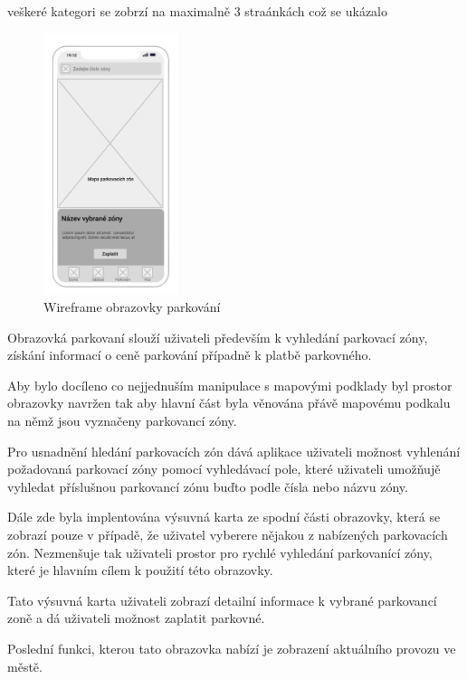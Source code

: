 veškeré kategori se zobrzí na maximalně 3 straánkách což se ukázalo


\begin{figure}
  \centering
  \includegraphics[width=0.35\textwidth]{parking_wireframe.png} 
  \caption{Wireframe obrazovky parkování}
\end{figure}

Obrazovká parkovaní slouží uživateli především k vyhledání parkovací zóny, získání informací o ceně parkování případně k platbě parkovného.

Aby bylo docíleno co nejjednuším manipulace s mapovými podklady byl prostor obrazovky navržen tak aby hlavní část byla věnována přávě mapovému
podkalu na němž jsou vyznačeny parkovancí zóny. 

Pro usnadnění hledání parkovacích zón dává aplikace uživateli možnost vyhlenání požadovaná parkovací zóny pomocí vyhledávací pole, které 
uživateli umožňujě vyhledat příslušnou parkovancí zónu buďto podle čísla nebo názvu zóny. 

Dále zde byla implentována výsuvná karta ze spodní části obrazovky, která se zobrazí pouze v případě, že uživatel vyberere nějakou
z nabízených parkovacích zón. Nezmenšuje tak uživateli prostor pro rychlé vyhledání parkovanící zóny, které je hlavním cílem k použití této obrazovky. 

Tato výsuvná karta uživateli zobrazí detailní informace k vybrané parkovancí zoně a dá uživateli možnost zaplatit parkovné.

Poslední funkci, kterou tato obrazovka nabízí je zobrazení aktuálního provozu ve městě. 



